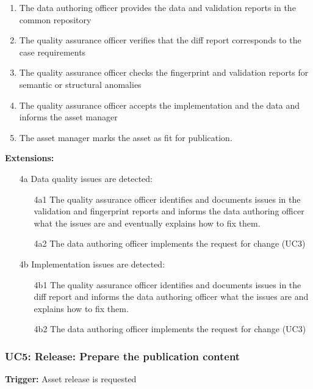 	\begin{enumerate}
		\item The data authoring officer provides the data and validation reports in the common repository 
		\item The quality assurance officer verifies that the diff report corresponds to the case requirements
		\item The quality assurance officer checks the fingerprint and validation reports for semantic or structural anomalies
		\item The quality assurance officer accepts the implementation and the data and informs the asset manager
		\item The asset manager marks the asset as fit for publication.
		
	\end{enumerate}
	
	\textbf{Extensions:}
	
	\begin{enumerate}
		\item [4a] Data quality issues are detected:
		\begin{enumerate}
			\item [4a1] The quality assurance officer identifies  and documents issues in the validation and fingerprint reports and informs the data authoring officer what the issues are and eventually explains how to fix them.
			\item [4a2] The data authoring officer implements the request for change (UC3)			
		\end{enumerate}
		\item [4b] Implementation issues are detected:
		\begin{enumerate}
			\item [4b1] The quality assurance officer identifies and documents issues in the diff report and informs the data authoring officer what the issues are and explains how to fix them.
			\item [4b2] The data authoring officer implements the request for change (UC3)			
		\end{enumerate}
	\end{enumerate}


	\subsubsection{UC5: Release: Prepare the publication content}
	\label{sec:uc5}
	\textbf{Trigger:} Asset release is requested
	
